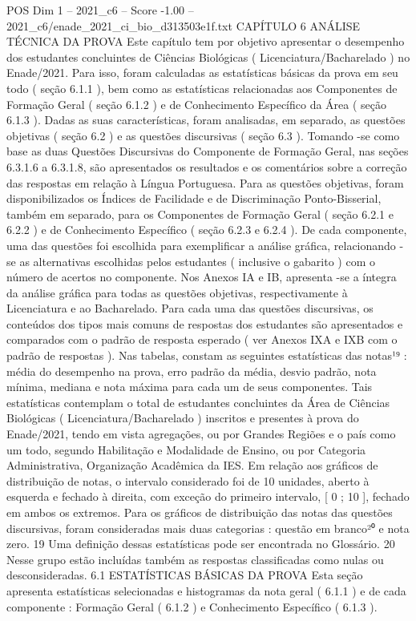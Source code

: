 \begin{textsample}{POS Dim 1 – 2021\_c6 – Score -1.00 – 2021\_c6/enade\_2021\_ci\_bio\_d313503e1f.txt}  \label{ex:f1_pos_201}
CAPÍTULO 6 ANÁLISE TÉCNICA DA PROVA Este capítulo tem por objetivo apresentar o desempenho dos estudantes concluintes de Ciências Biológicas ( Licenciatura/Bacharelado ) no Enade/2021.
Para isso, foram calculadas as estatísticas básicas da prova em seu todo ( seção 6.1.1 ), bem como as estatísticas relacionadas aos Componentes de Formação Geral ( seção 6.1.2 ) e de Conhecimento Específico da Área ( seção 6.1.3 ).
Dadas as suas características, foram analisadas, em separado, as questões objetivas ( seção 6.2 ) e as questões discursivas ( seção 6.3 ).
Tomando -se como base as duas Questões Discursivas do Componente de Formação Geral, nas seções 6.3.1.6 a 6.3.1.8, são apresentados os resultados e os comentários sobre a correção das respostas em relação à Língua Portuguesa.
Para as questões objetivas, foram disponibilizados os Índices de Facilidade e de Discriminação Ponto-Bisserial, também em separado, para os Componentes de Formação Geral ( seção 6.2.1 e 6.2.2 ) e de Conhecimento Específico ( seção 6.2.3 e 6.2.4 ).
De cada componente, uma das questões foi escolhida para exemplificar a análise gráfica, relacionando -se as alternativas escolhidas pelos estudantes ( inclusive o gabarito ) com o número de acertos no componente.
Nos Anexos IA e IB, apresenta -se a íntegra da análise gráfica para todas as questões objetivas, respectivamente à Licenciatura e ao Bacharelado.
Para cada uma das questões discursivas, os conteúdos dos tipos mais comuns de respostas dos estudantes são apresentados e comparados com o padrão de resposta esperado ( ver Anexos IXA e IXB com o padrão de respostas ).
Nas tabelas, constam as seguintes estatísticas das notas¹⁹ : média do desempenho na prova, erro padrão da média, desvio padrão, nota mínima, mediana e nota máxima para cada um de seus componentes.
Tais estatísticas contemplam o total de estudantes concluintes da Área de Ciências Biológicas ( Licenciatura/Bacharelado ) inscritos e presentes à prova do Enade/2021, tendo em vista agregações, ou por Grandes Regiões e o país como um todo, segundo Habilitação e Modalidade de Ensino, ou por Categoria Administrativa, Organização Acadêmica da IES.
Em relação aos gráficos de distribuição de notas, o intervalo considerado foi de 10 unidades, aberto à esquerda e fechado à direita, com exceção do primeiro intervalo, [ 0 ; 10 ], fechado em ambos os extremos.
Para os gráficos de distribuição das notas das questões discursivas, foram consideradas mais duas categorias : questão em branco²⁰ e nota zero. 19 Uma definição dessas estatísticas pode ser encontrada no Glossário. 20 Nesse grupo estão incluídas também as respostas classificadas como nulas ou desconsideradas. 6.1 ESTATÍSTICAS BÁSICAS DA PROVA Esta seção apresenta estatísticas selecionadas e histogramas da nota geral ( 6.1.1 ) e de cada componente : Formação Geral ( 6.1.2 ) e Conhecimento Específico ( 6.1.3 ).

\end{textsample}
